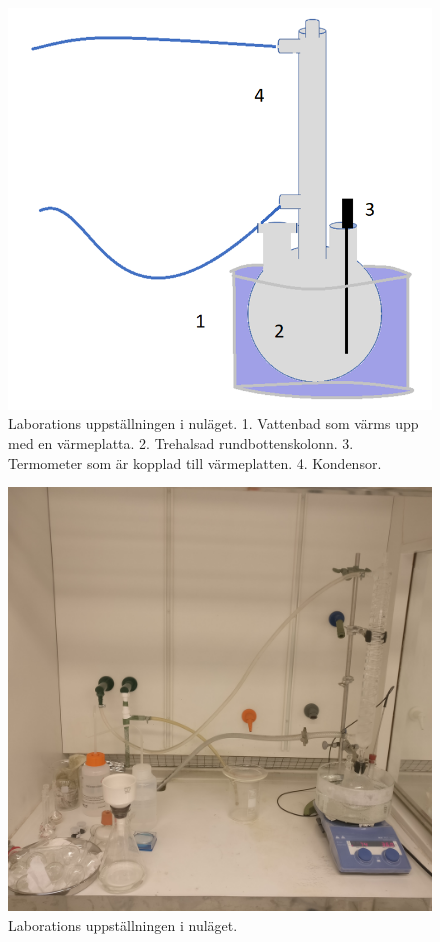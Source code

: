 \newpage
\thispagestyle{empty}
\begin{figure}[H]
    \centering
    \includegraphics[scale=0.6]{labbupp.png}
    \caption{Laborations uppställningen i nuläget. 1. Vattenbad som värms upp med en värmeplatta. 2. Trehalsad rundbottenskolonn. 3. Termometer som är kopplad till värmeplatten. 4. Kondensor.    }
    \label{fig:lab}
\end{figure}

\newpage
\thispagestyle{empty}
\begin{figure}[H]
    \centering
    \includegraphics[scale=0.1]{labsetup.jpg}
    \caption{Laborations uppställningen i nuläget.}
    \label{fig:labpaint}
\end{figure}



